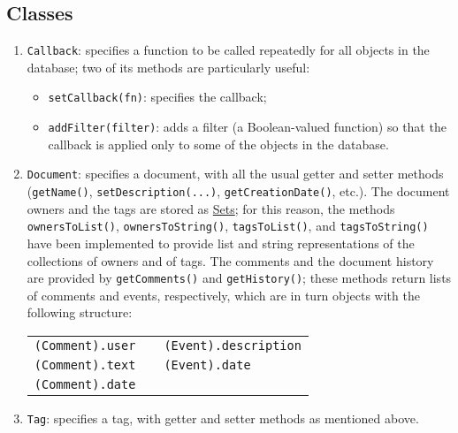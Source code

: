 \documentclass[a4,12pt]{article}
\begin{document}
\subsection*{Classes}

\begin{enumerate}[- , noitemsep, topsep=-0.5em]

\item \verb+Callback+: specifies a function to be called repeatedly for all objects in the database;
  two of its methods are particularly useful:
  \begin{itemize}[-, noitemsep]
  \item \verb+setCallback(fn)+: specifies the callback;
  \item \verb+addFilter(filter)+: adds a filter (a Boolean-valued function) so that the callback is applied only to some of the objects in the database.
  \end{itemize}
  
\item \verb+Document+: specifies a document, with all the usual getter and setter methods (\verb+getName()+, \verb+setDescription(...)+, \verb+getCreationDate()+, etc.).
  The document owners and the tags are stored as \href{https://developer.mozilla.org/en-US/docs/Web/JavaScript/Reference/Global_Objects/Set}{Sets}; for this reason, the methods \verb+ownersToList()+, \verb+ownersToString()+, \verb+tagsToList()+, and \verb+tagsToString()+ have been implemented to provide list and string representations of the collections of owners and of tags.
  The comments and the document history are provided by \verb+getComments()+ and \verb+getHistory()+; these methods return lists of comments and events, respectively, which are in turn objects with the following structure:
  \begin{center}
    \begin{tabular}{lll}
      \verb+(Comment).user+ && \verb+(Event).description+
      \\
      \verb+(Comment).text+ && \verb+(Event).date+
      \\
      \verb+(Comment).date+ & \hspace{3em} &
      \\
    \end{tabular}
  \end{center}

\item \verb+Tag+: specifies a tag, with getter and setter methods as mentioned above.

\end{enumerate}
\end{document}
